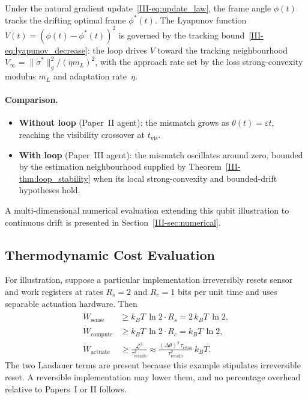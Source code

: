 \documentclass[12pt,a4paper,openany]{book}
\begin{document}
Under the natural gradient
update~\eqref{III-eq:update_law}, the frame angle
$\phi(t)$ tracks the drifting optimal frame
$\phi^*(t)$.
The Lyapunov function
$V(t) = (\phi(t) - \phi^*(t))^2$ is governed by the
tracking bound~\eqref{III-eq:lyapunov_decrease}:
the loop drives $V$ toward the tracking neighbourhood
$V_\infty = \|\dot{\sigma}^*\|_g^2/(\eta m_L)^2$,
with the approach rate set by the loss strong-convexity modulus $m_L$
and adaptation rate~$\eta$.

\paragraph{Comparison.}
\begin{itemize}
\item \textbf{Without loop} (Paper~II agent): the mismatch
  grows as $\theta(t)=\varepsilon t$, reaching the visibility
  crossover at $t_{\mathrm{vis}}$.
\item \textbf{With loop} (Paper~III agent): the mismatch
  oscillates around zero, bounded by the estimation
  neighbourhood supplied by Theorem~\ref{III-thm:loop_stability} when its
  local strong-convexity and bounded-drift hypotheses hold.
\end{itemize}

A multi-dimensional numerical evaluation extending
this qubit illustration to continuous drift is presented
in Section~\ref{III-sec:numerical}.

\subsection{Thermodynamic Cost Evaluation}
\label{III-subsec:cost_eval}

For illustration, suppose a particular implementation irreversibly
resets sensor and work registers at rates $R_s=2$ and $R_c=1$ bits per
unit time and uses separable actuation hardware.  Then
\begin{align}
\dot{W}_{\mathrm{sense}}
&\geq k_BT\,\ln 2 \cdot R_s
= 2\,k_BT\,\ln 2, \label{III-eq:cost_sense_ex} \\
\dot{W}_{\mathrm{compute}}
&\geq k_BT\,\ln 2 \cdot R_c
= k_BT\,\ln 2, \label{III-eq:cost_compute_ex} \\
\dot{W}_{\mathrm{actuate}}
&\geq \frac{\mathcal{L}^2}{\tau_{\mathrm{recalib}}^2}
\approx \frac{(\Delta\theta)^2\,\tau_{\mathrm{relax}}}
  {\tau_{\mathrm{recalib}}^2}\,k_BT.
  \label{III-eq:cost_actuate_ex}
\end{align}
The two Landauer terms are present because this example stipulates
irreversible reset.  A reversible implementation may lower them, and
no percentage overhead relative to Papers~I or II follows.
\end{document}

